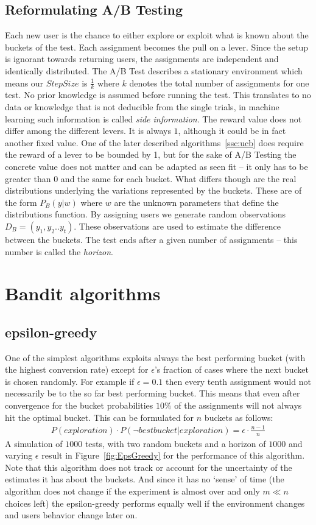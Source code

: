 \documentclass[main.tex]{subfiles}
\begin{document}
\subsection{Reformulating A/B Testing}
Each new user is the chance to either explore or exploit what is known about the buckets of the test. Each assignment becomes the pull on a lever. Since the setup is ignorant towards returning users, the assignments are independent and identically distributed. The A/B Test describes a stationary environment which means our $StepSize$ is $\frac{1}{k}$ where $k$ denotes the total number of assignments for one test. No prior knowledge is assumed before running the test. This translates to no data or knowledge that is not deducible from the single trials, in machine learning such information is called \emph{side information}. The reward value does not differ among the different levers. It is always $1$, although it could be in fact another fixed value. One of the later described algorithms~\ref{ssc:ucb} does require the reward of a lever to be bounded by 1, but for the sake of A/B Testing the concrete value does not matter and can be adapted as seen fit -- it only has to be greater than $0$ and the same for each bucket. What differs though are the real distributions underlying the variations represented by the buckets. These are of the form $P_B(y|w)$ where $w$ are the unknown parameters that define the distributions function. By assigning users we generate random observations $D_B=(y_1,y_2..y_t)$. These observations are used to estimate the difference between the buckets. The test ends after a given number of assignments -- this number is called the \emph{horizon}.

\section{Bandit algorithms}
\subsection{epsilon-greedy}
One of the simplest algorithms exploits always the best performing bucket (with the highest conversion rate) except for $\epsilon $'s fraction of cases where the next bucket is chosen randomly. For example if $\epsilon = 0.1$ then every tenth assignment would not necessarily be to the so far best performing bucket. This means that even after convergence for the bucket probabilities $10\%$ of the assignments will not always hit the optimal bucket. This can be formulated for $n$ buckets as follows:
\begin{align*}
P(exploration) \cdot P(\neg best bucket | exploration) = \epsilon \cdot \frac{n-1}{n}
\end{align*}
A simulation of $1000$ tests, with two random buckets and a horizon of $1000$ and varying $\epsilon$ result in Figure~\ref{fig:EpsGreedy} for the performance of this algorithm. Note that this algorithm does not track or account for the uncertainty of the estimates it has about the buckets. And since it has no `sense' of time (the algorithm does not change if the experiment is almost over and only $m \ll n$ choices left) the epsilon-greedy performs equally well if the environment changes and users behavior change later on.
\end{document}
